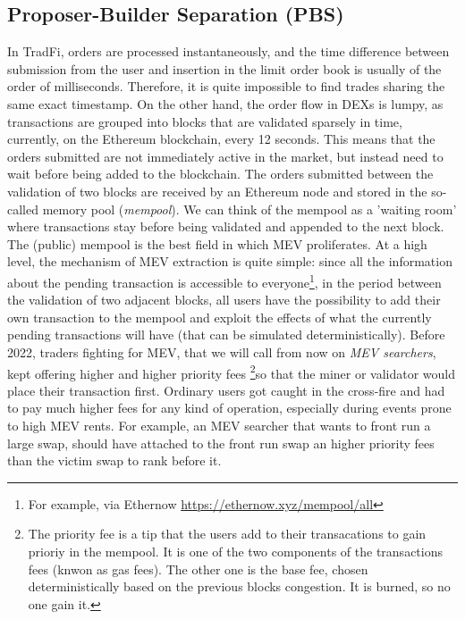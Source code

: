 \documentclass[a4paper,11pt]{article}
\begin{document}
\subsection{Proposer-Builder Separation (PBS)}
In TradFi, orders are processed instantaneously, and the time difference between submission from the user and insertion in the limit order book is usually of the order of milliseconds. Therefore, it is quite impossible to find trades sharing the same exact timestamp. On the other hand, the order flow in DEXs is lumpy, as transactions are grouped into blocks that are validated sparsely in time, currently, on the Ethereum blockchain, every 12 seconds. This means that the orders submitted are not immediately active in the market, but instead need to wait before being added to the blockchain. The orders submitted between the validation of two blocks are received by an Ethereum node and stored in the so-called memory pool (\textit{mempool}). We can think of the mempool as a 'waiting room' where transactions stay before being validated and appended to the next block. The (public) mempool is the best field in which MEV proliferates. At a high level, the mechanism of MEV extraction is quite simple: since all the information about the pending transaction is accessible to everyone\footnote{For example, via Ethernow \url{https://ethernow.xyz/mempool/all}}, in the period between the validation of two adjacent blocks, all users have the possibility to add their own transaction to the mempool and exploit the effects of what the currently pending transactions will have (that can be simulated deterministically). Before 2022, traders fighting for MEV, that we will call from now on \textit{MEV searchers}, kept offering higher and higher priority fees \footnote{The priority fee is a tip that the users add to their transacations to gain prioriy in the mempool. It is one of the two components of the transactions fees (knwon as gas fees). The other one is the base fee, chosen deterministically based on the previous blocks congestion. It is burned, so no one gain it.}so that the miner or validator would place their transaction first. Ordinary users got caught in the cross-fire and had to pay much higher fees for any kind of operation, especially during events prone to high MEV rents. For example, an MEV searcher that wants to front run a large swap, should have attached to the front run swap an higher priority fees than the victim swap to rank before it.
\end{document}
